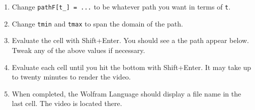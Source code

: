 \begin{enumerate}
\item Change \verb+pathF[t_] = ...+ to be whatever path you want in terms of \verb+t+.
\item Change \verb+tmin+ and \verb+tmax+ to span the domain of the path.
\item Evaluate the cell with Shift+Enter. You should see a the path appear below. Tweak any of the above values if necessary.
\item Evaluate each cell until you hit the bottom with Shift+Enter. It may take up to twenty minutes to render the video.
\item When completed, the Wolfram Language should display a file name in the last cell. The video is located there.
\end{enumerate}
